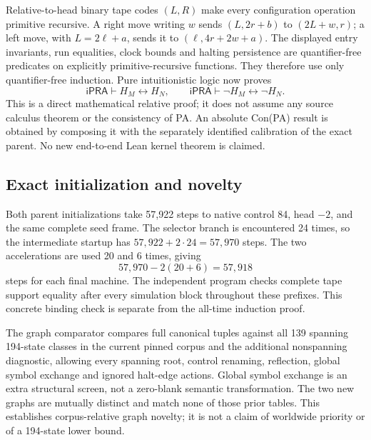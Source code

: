 Relative-to-head binary tape codes $(L,R)$ make every configuration
operation primitive recursive. A right move writing $w$ sends
$(L,2r+b)$ to $(2L+w,r)$; a left move, with $L=2\ell+a$, sends it to
$(\ell,4r+2w+a)$. The displayed entry invariants, run equalities, clock
bounds and halting persistence are quantifier-free predicates on explicitly
primitive-recursive functions. They therefore use only quantifier-free
induction. Pure intuitionistic logic now proves
\[
 \mathsf{iPRA}\vdash H_M\leftrightarrow H_N,
 \qquad
 \mathsf{iPRA}\vdash\neg H_M\leftrightarrow\neg H_N.
\]
This is a direct mathematical relative proof; it does not assume any source
calculus theorem or the consistency of PA. An absolute Con(PA) result is
obtained by composing it with the separately identified calibration of the
exact parent. No new end-to-end Lean kernel theorem is claimed.

\subsection{Exact initialization and novelty}

Both parent initializations take 57,922 steps to native control 84, head
$-2$, and the same complete seed frame. The selector branch is encountered
24 times, so the intermediate startup has $57,922+2\cdot24=57,970$ steps.
The two accelerations are used 20 and 6 times, giving
\[
 57,970-2(20+6)=57,918
\]
steps for each final machine. The independent program checks complete tape
support equality after every simulation block throughout these prefixes.
This concrete binding check is separate from the all-time induction proof.

The graph comparator compares full canonical tuples against all 139
spanning 194-state classes in the current pinned corpus and the additional
nonspanning diagnostic, allowing every spanning root, control renaming,
reflection, global symbol exchange and ignored halt-edge actions. Global
symbol exchange is an extra structural screen, not a zero-blank semantic
transformation. The two new graphs are mutually distinct and match none
of those prior tables. This establishes corpus-relative graph novelty;
it is not a claim of worldwide priority or of a 194-state lower bound.
